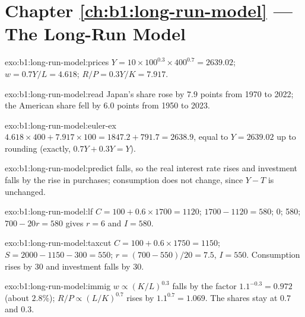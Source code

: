 \section*{Chapter \ref{ch:b1:long-run-model} --- The Long-Run Model}

\begin{solution}{exo:b1:long-run-model:prices}
$Y = 10 \times 100^{0.3} \times 400^{0.7} = 2639.02$; $w = 0.7Y/L = 4.618$; $R/P = 0.3Y/K = 7.917$.
\end{solution}

\begin{solution}{exo:b1:long-run-model:read}
Japan's share rose by $7.9$ points from 1970 to 2022; the American share fell
by $6.0$ points from 1950 to 2023.
\end{solution}

\begin{solution}{exo:b1:long-run-model:euler-ex}
$4.618 \times 400 + 7.917 \times 100 = 1847.2 + 791.7 = 2638.9$, equal to $Y = 2639.02$ up to rounding
(exactly, $0.7Y + 0.3Y = Y$).
\end{solution}

\begin{solution}{exo:b1:long-run-model:predict}
 falls, so the real interest rate rises and investment falls
by the rise in purchases; consumption does not change, since $Y - T$ is
unchanged.
\end{solution}

\begin{solution}{exo:b1:long-run-model:lf}
$C = 100 + 0.6 \times 1700 = 1120$;  $1700 - 1120 = 580$;  0;
 580; $700 - 20r = 580$ gives $r = 6$ and $I = 580$.
\end{solution}

\begin{solution}{exo:b1:long-run-model:taxcut}
$C = 100 + 0.6 \times 1750 = 1150$; $S = 2000 - 1150 - 300 = 550$; $r = (700 - 550)/20 = 7.5$, $I = 550$.
Consumption rises by 30 and investment falls by 30.
\end{solution}

\begin{solution}{exo:b1:long-run-model:immig}
$w \propto (K/L)^{0.3}$ falls by the factor $1.1^{-0.3} = 0.972$ (about $2.8\%$); $R/P \propto (L/K)^{0.7}$ rises
by $1.1^{0.7} = 1.069$. The shares stay at $0.7$ and $0.3$.
\end{solution}

